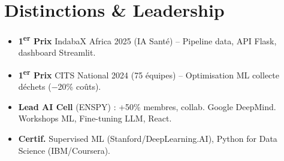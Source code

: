 \documentclass[a4paper,11pt]{article}
\begin{document}
\section{Distinctions \& Leadership}
\begin{itemize}[leftmargin=*, label=\tiny$\bullet$, nosep]
    \item \small{\textbf{1\textsuperscript{er} Prix} IndabaX Africa 2025 (IA Santé) -- Pipeline data, API Flask, dashboard Streamlit.}
    \item \small{\textbf{1\textsuperscript{er} Prix} CITS National 2024 (75 équipes) -- Optimisation ML collecte déchets ($-$20\% coûts).}
    \item \small{\textbf{Lead AI Cell} (ENSPY) : +50\% membres, collab. Google DeepMind. Workshops ML, Fine-tuning LLM, React.}
    \item \small{\textbf{Certif.} Supervised ML (Stanford/DeepLearning.AI), Python for Data Science (IBM/Coursera).}
\end{itemize}
\end{document}
